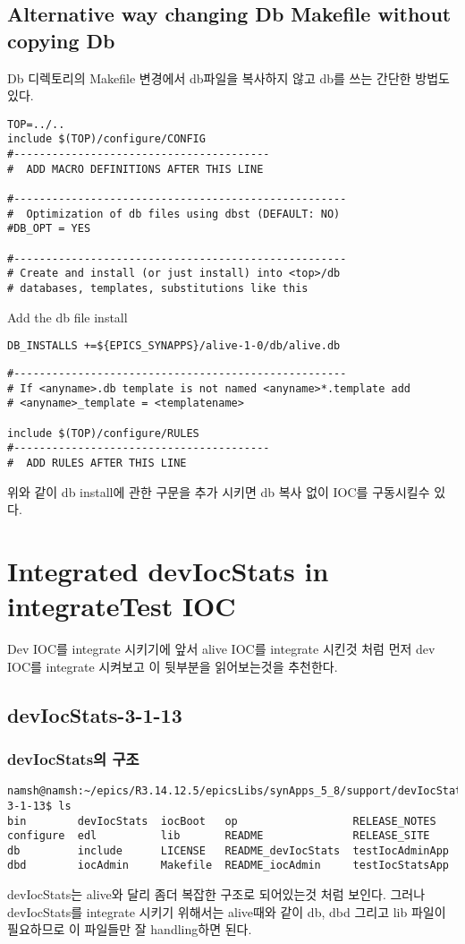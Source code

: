 \documentclass[11pt
  , a4paper
  , article
  , oneside
]{memoir}
\begin{document}
\section{Alternative way changing Db Makefile without copying Db}
Db 디렉토리의 Makefile 변경에서 db파일을 복사하지 않고 db를 쓰는 간단한 방법도 있다.
\begin{lstlisting}[style=termstyle]
TOP=../..
include $(TOP)/configure/CONFIG
#----------------------------------------
#  ADD MACRO DEFINITIONS AFTER THIS LINE

#----------------------------------------------------
#  Optimization of db files using dbst (DEFAULT: NO)
#DB_OPT = YES

#----------------------------------------------------
# Create and install (or just install) into <top>/db
# databases, templates, substitutions like this
\end{lstlisting}
Add the db file install
\begin{lstlisting}[style=termstyle]
DB_INSTALLS +=${EPICS_SYNAPPS}/alive-1-0/db/alive.db
\end{lstlisting}
\begin{lstlisting}[style=termstyle]
#----------------------------------------------------
# If <anyname>.db template is not named <anyname>*.template add
# <anyname>_template = <templatename>

include $(TOP)/configure/RULES
#----------------------------------------
#  ADD RULES AFTER THIS LINE

\end{lstlisting}
위와 같이 db install에 관한 구문을 추가 시키면 db 복사 없이 IOC를 구동시킬수 있다.
\clearpage
\chapter{Integrated devIocStats in integrateTest IOC}
Dev IOC를 integrate 시키기에 앞서 alive IOC를 integrate 시킨것 처럼 먼저 dev IOC를 integrate 시켜보고 이 뒷부분을 읽어보는것을 추천한다.
\section{devIocStats-3-1-13}
\subsection{devIocStats의 구조}
\begin{lstlisting}[style=termstyle]
namsh@namsh:~/epics/R3.14.12.5/epicsLibs/synApps_5_8/support/devIocStats-3-1-13$ ls
bin        devIocStats  iocBoot   op                  RELEASE_NOTES
configure  edl          lib       README              RELEASE_SITE
db         include      LICENSE   README_devIocStats  testIocAdminApp
dbd        iocAdmin     Makefile  README_iocAdmin     testIocStatsApp
\end{lstlisting}
devIocStats는 alive와 달리 좀더 복잡한 구조로 되어있는것 처럼 보인다. 그러나 devIocStats를 integrate 시키기 위해서는 alive때와 같이 db, dbd 그리고 lib 파일이 필요하므로 이 파일들만 잘 handling하면 된다.
\end{document}
